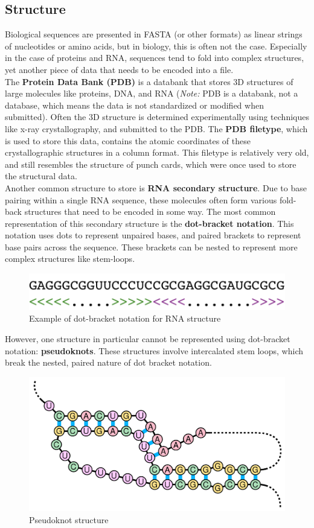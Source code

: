\documentclass[12pt]{article}
\begin{document}
\subsection{Structure}
Biological sequences are presented in FASTA (or other formats) as linear strings of nucleotides or amino acids, but in biology, this is often not the case. Especially in the case of proteins and RNA, sequences tend to fold into complex structures, yet another piece of data that needs to be encoded into a file.\\[10pt]
The {\bf Protein Data Bank (PDB)} is a databank that stores 3D structures of large molecules like proteins, DNA, and RNA ({\it Note:} PDB is a databank, not a database, which means the data is not standardized or modified when submitted). Often the 3D structure is determined experimentally using techniques like x-ray crystallography, and submitted to the PDB. The \textbf{PDB filetype}, which is used to store this data, contains the atomic coordinates of these crystallographic structures in a column format. This filetype is relatively very old, and still resembles the structure of punch cards, which were once used to store the structural data. \\[10pt]
Another common structure to store is {\bf RNA secondary structure}. Due to base pairing within a single RNA sequence, these molecules often form various fold-back structures that need to be encoded in some way. The most common representation of this secondary structure is the {\bf dot-bracket notation}. This notation uses dots to represent unpaired bases, and paired brackets to represent base pairs across the sequence. These brackets can be nested to represent more complex structures like stem-loops. 
\begin{figure}[h]
    \centering
    \includegraphics[width = .65\linewidth]{rna}  
    \caption{Example of dot-bracket notation for RNA structure}
    \label{fig:rna}
\end{figure}

However, one structure in particular cannot be represented using dot-bracket notation: {\bf pseudoknots}. These structures involve intercalated stem loops, which break the nested, paired nature of dot bracket notation.
\begin{figure}[h]
    \centering
    \includegraphics[width = .6\linewidth]{pseudo}
    \caption{Pseudoknot structure}
    \label{fig:my_label}
\end{figure}
\end{document}
